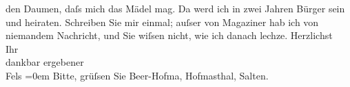 \begin{ledgroupsized}[t]{13cm}
                    den Daumen, daſs mich das Mädel mag. Da{\geminationn} werd ich
                    in zwei Jahren Bürger \introOben{}sein\introOben{} und heiraten.\pend
           \pstart
           Schreiben Sie mir einmal; auſser von Magaziner hab ich von niemandem Nachricht, und Sie wiſsen nicht, wie
                    ich danach lechze.\pend
           \pstart
           Herzlichst{\\[\baselineskip]}Ihr{\\[\baselineskip]}dankbar ergebener{\\[\baselineskip]}\spacefill\mbox{Fels}\pend
           \leftskip=0em{}\pstart
           \noindent{}Bitte, grüſsen Sie Beer-Hofma{\geminationn}, Hofma{\geminationn}sthal, Salten.\pend
           
         
         \endnumbering{}\end{ledgroupsized}  \newcommand{\dateiname}{L00447}\newcommand{\titel}{Friedrich M. Fels an Arthur Schnitzler, [1. Hälfte Juni 1895]}\newcommand{\editorInnen}{Martin Anton Müller und Gerd-Hermann Susen}
      